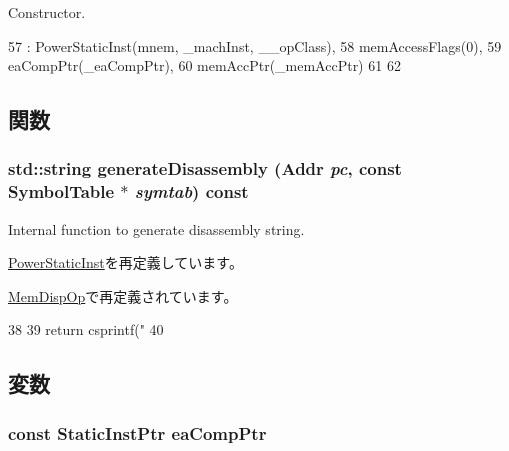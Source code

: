 Constructor. 


\begin{DoxyCode}
57       : PowerStaticInst(mnem, _machInst, __opClass),
58         memAccessFlags(0),
59         eaCompPtr(_eaCompPtr),
60         memAccPtr(_memAccPtr)
61     {
62     }
\end{DoxyCode}


\subsection{関数}
\hypertarget{classPowerISA_1_1MemOp_a95d323a22a5f07e14d6b4c9385a91896}{
\subsubsection[{generateDisassembly}]{\setlength{\rightskip}{0pt plus 5cm}std::string generateDisassembly ({\bf Addr} {\em pc}, \/  const SymbolTable $\ast$ {\em symtab}) const}}
\label{classPowerISA_1_1MemOp_a95d323a22a5f07e14d6b4c9385a91896}
Internal function to generate disassembly string. 

\hyperlink{classPowerISA_1_1PowerStaticInst_a95d323a22a5f07e14d6b4c9385a91896}{PowerStaticInst}を再定義しています。

\hyperlink{classPowerISA_1_1MemDispOp_a95d323a22a5f07e14d6b4c9385a91896}{MemDispOp}で再定義されています。


\begin{DoxyCode}
38 {
39     return csprintf("%
40 }
\end{DoxyCode}


\subsection{変数}
\hypertarget{classPowerISA_1_1MemOp_adb8a3682fa5971df32e2bf1109adc24d}{
\subsubsection[{eaCompPtr}]{\setlength{\rightskip}{0pt plus 5cm}const {\bf StaticInstPtr} {\bf eaCompPtr}}}
\label{classPowerISA_1_1MemOp_adb8a3682fa5971df32e2bf1109adc24d}


